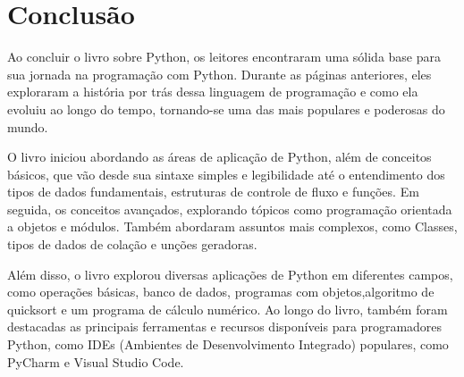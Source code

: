 

\chapter{Conclus\~{a}o}

Ao concluir o livro sobre Python, os leitores encontraram uma sólida base para sua jornada na programação com Python. Durante as páginas anteriores, eles exploraram a história por trás dessa linguagem de programação e como ela evoluiu ao longo do tempo, tornando-se uma das mais populares e poderosas do mundo.

O livro iniciou abordando as áreas de aplicação de Python, além de conceitos básicos, que vão desde sua sintaxe simples e legibilidade até o entendimento dos tipos de dados fundamentais, estruturas de controle de fluxo e funções. Em seguida, os conceitos avançados, explorando tópicos como programação orientada a objetos e módulos. Também abordaram assuntos mais complexos, como Classes, tipos de dados de colação e unções geradoras.

Além disso, o livro explorou diversas aplicações de Python em diferentes campos, como operações básicas, banco de dados, programas com objetos,algoritmo de quicksort e um programa de cálculo numérico. Ao longo do livro, também foram destacadas as principais ferramentas e recursos disponíveis para programadores Python, como IDEs (Ambientes de Desenvolvimento Integrado) populares, como PyCharm e Visual Studio Code.
